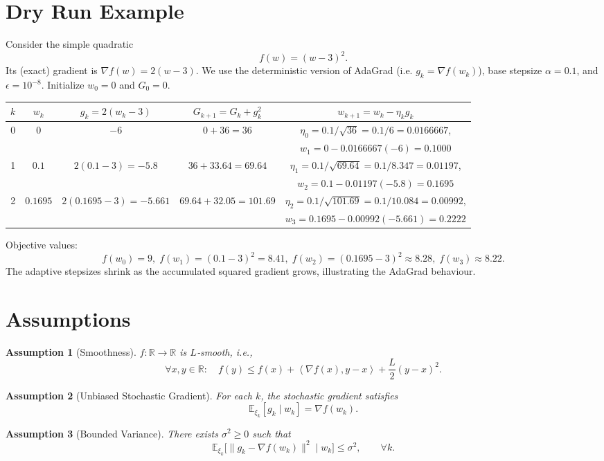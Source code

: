 \documentclass{article}
\newtheorem{assumption}{Assumption}
\newcommand{\E}{\mathbb{E}}
\newcommand{\inner}[2]{\left\langle #1,#2\right\rangle}
\begin{document}
\section*{Dry Run Example}
Consider the simple quadratic
\[
f(w) = (w-3)^2 .
\]
Its (exact) gradient is $\nabla f(w)=2(w-3)$.  
We use the deterministic version of AdaGrad (i.e. $g_k=\nabla f(w_k)$),
base stepsize $\alpha=0.1$, and $\epsilon=10^{-8}$.
Initialize $w_0=0$ and $G_0=0$.

\begin{center}
\begin{tabular}{c|c|c|c|c}
$k$ & $w_k$ & $g_k=2(w_k-3)$ & $G_{k+1}=G_k+g_k^2$ & $w_{k+1}=w_k-\eta_k g_k$\\ \hline
0 & $0$ & $-6$ & $0+36=36$ & $\eta_0=0.1/\sqrt{36}=0.1/6=0.0166667$,\\
  &   &   &   & $w_1=0-0.0166667(-6)=0.1000$\\ \hline
1 & $0.1$ & $2(0.1-3)=-5.8$ & $36+33.64=69.64$ & $\eta_1=0.1/\sqrt{69.64}=0.1/8.347=0.01197$,\\
  &   &   &   & $w_2=0.1-0.01197(-5.8)=0.1695$\\ \hline
2 & $0.1695$ & $2(0.1695-3)=-5.661$ & $69.64+32.05=101.69$ & $\eta_2=0.1/\sqrt{101.69}=0.1/10.084=0.00992$,\\
  &   &   &   & $w_3=0.1695-0.00992(-5.661)=0.2222$
\end{tabular}
\end{center}
Objective values:
\[
f(w_0)=9,\; f(w_1)= (0.1-3)^2=8.41,\; f(w_2)= (0.1695-3)^2\approx8.28,\;
f(w_3)\approx8.22 .
\]
The adaptive stepsizes shrink as the accumulated squared gradient grows,
illustrating the AdaGrad behaviour.

\section*{Assumptions}
\begin{assumption}[Smoothness]\label{ass:smooth}
$f:\mathbb{R}\rightarrow\mathbb{R}$ is $L$‑smooth, i.e.,
\[
\forall x,y\in\mathbb{R}:\quad
f(y)\le f(x)+\inner{\nabla f(x)}{y-x}+\frac{L}{2}(y-x)^2 .
\]
\end{assumption}

\begin{assumption}[Unbiased Stochastic Gradient]\label{ass:unbiased}
For each $k$, the stochastic gradient satisfies
\[
\E_{\xi_k}[g_k \mid w_k]=\nabla f(w_k).
\]
\end{assumption}

\begin{assumption}[Bounded Variance]\label{ass:variance}
There exists $\sigma^2\ge0$ such that
\[
\E_{\xi_k}\!\big[\|g_k-\nabla f(w_k)\|^{2}\mid w_k\big]\le\sigma^{2},
\qquad\forall k .
\]
\end{assumption}
\end{document}
